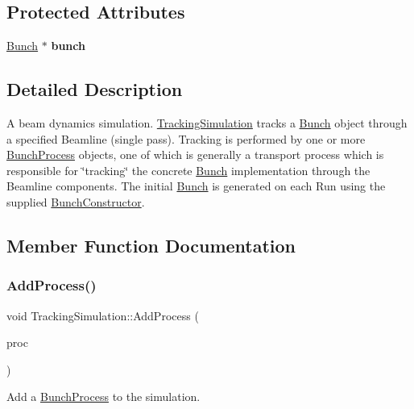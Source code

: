 \subsection*{Protected Attributes}
\begin{DoxyCompactItemize}
\item 
\mbox{\label{classTrackingSimulation_ab67eba68a43968f06b09537c85676634}} 
\hyperlink{classBunch}{Bunch} $\ast$ {\bfseries bunch}
\end{DoxyCompactItemize}


\subsection{Detailed Description}
A beam dynamics simulation. \hyperlink{classTrackingSimulation}{Tracking\+Simulation} tracks a \hyperlink{classBunch}{Bunch} object through a specified Beamline (single pass). Tracking is performed by one or more \hyperlink{classBunchProcess}{Bunch\+Process} objects, one of which is generally a transport process which is responsible for \char`\"{}tracking\char`\"{} the concrete \hyperlink{classBunch}{Bunch} implementation through the Beamline components. The initial \hyperlink{classBunch}{Bunch} is generated on each Run using the supplied \hyperlink{classBunchConstructor}{Bunch\+Constructor}. 

\subsection{Member Function Documentation}
\mbox{\label{classTrackingSimulation_a26e85f3096ca9fffd3362a2b8ccc6ef5}} 
\subsubsection{\texorpdfstring{Add\+Process()}{AddProcess()}}
{\footnotesize\ttfamily void Tracking\+Simulation\+::\+Add\+Process (\begin{DoxyParamCaption}\item[{\hyperlink{classBunchProcess}{Bunch\+Process} $\ast$}]{proc }\end{DoxyParamCaption})}

Add a \hyperlink{classBunchProcess}{Bunch\+Process} to the simulation. \mbox{\label{classTrackingSimulation_a18356dbb48aec5142fecf20fc0582b92}} 
